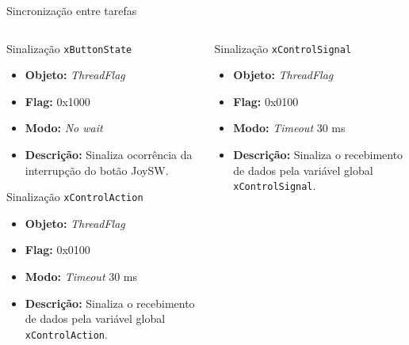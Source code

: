 \documentclass{if-beamer}
\begin{document}
\begin{frame}{Sincronização entre tarefas}
	
	\begin{columns}
		
		\begin{column}{0.5\textwidth}
			
				\begin{block}{Sinalização \texttt{xButtonState}}
				
				\begin{itemize}
					\item \textbf{Objeto:} \textit{ThreadFlag}
					\item \textbf{Flag:} 0x1000
					\item \textbf{Modo:} \textit{No wait}
					\item \textbf{Descrição:} Sinaliza ocorrência da interrupção do botão JoySW.
					
				\end{itemize}
				
			\end{block}
	
			\pause

			\begin{block}{Sinalização \texttt{xControlAction}}
			
			\begin{itemize}
				\item \textbf{Objeto:} \textit{ThreadFlag}
				\item \textbf{Flag:} 0x0100
				\item \textbf{Modo:} \textit{Timeout} 30 ms
				\item \textbf{Descrição:} Sinaliza o recebimento de dados pela variável global \texttt{xControlAction}.
				
			\end{itemize}	
			
			\end{block}
			
			\pause
			
		\end{column}
		
		\begin{column}{0.5\textwidth}
			
			\begin{block}{Sinalização \texttt{xControlSignal}}
				
				\begin{itemize}
					\item \textbf{Objeto:} \textit{ThreadFlag}
					\item \textbf{Flag:} 0x0100
					\item \textbf{Modo:} \textit{Timeout} 30 ms
					\item \textbf{Descrição:} Sinaliza o recebimento de dados pela variável global \texttt{xControlSignal}.
					

\end{itemize}
\end{block}
\end{column}
\end{columns}
\end{frame}
\end{document}
